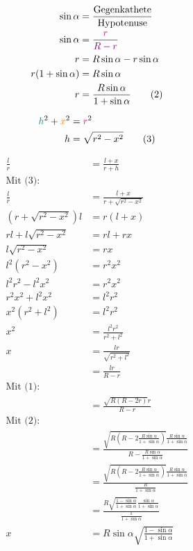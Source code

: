 \documentclass[12pt,a4paper,oneside]{article}
\begin{document}
\begin{align*}
	\sin\alpha &= \frac{\text{Gegenkathete}}{\text{Hypotenuse}} \\
	\sin\alpha &= \frac{ \textcolor{magenta}{r} }{ \textcolor{violet}{R-r} } \\
	r &= R\sin\alpha - r\sin\alpha \\
	r(1+\sin\alpha) &= R\sin\alpha \\
	r &= \frac{R\sin\alpha}{1+\sin\alpha} \tag{2}
\end{align*}

\begin{align*}
	\textcolor{teal}{h}^2 + \textcolor{orange}{x}^2 &= \textcolor{magenta}{r}^2 \\
	h &= \sqrt{r^2-x^2} \tag{3}
\end{align*}

\begin{samepage}
	\begin{align*}
		\frac{l}{r} &= \frac{l+x}{r+h} \\
		\text{Mit (3):} \\
		\frac{l}{r} &= \frac{l+x}{r+\sqrt{r^2-x^2}} \\
		(r+\sqrt{r^2-x^2})l &= r(l+x) \\
		rl + l\sqrt{r^2-x^2} &= rl+rx \\
		l\sqrt{r^2-x^2} &= rx \\
		l^2(r^2-x^2) &= r^2 x^2 \\
		l^2 r^2 - l^2 x^2 &= r^2 x^2 \\
		r^2 x^2 + l^2 x^2 &= l^2 r^2 \\
		x^2 (r^2+l^2) &= l^2 r^2 \\
		x^2 &= \frac{l^2 r^2}{r^2 + l^2} \\
		x &= \frac{lr}{\sqrt{r^2+l^2}} \\
		&= \frac{lr}{R-r} \\
		\text{Mit (1):} \\
		&= \frac{\sqrt{R(R-2r)}r}{R-r} \\
		\text{Mit (2):} \\
		&= \frac{\sqrt{R(R-2\frac{R\sin\alpha}{1+\sin\alpha})}\frac{R\sin\alpha}{1+\sin\alpha}}{R-\frac{R\sin\alpha}{1+\sin\alpha}} \\
		&= \frac{\sqrt{R(R-2\frac{R\sin\alpha}{1+\sin\alpha})}\frac{R\sin\alpha}{1+\sin\alpha}}{\frac{R}{1+\sin\alpha}} \\
		&= \frac{R\sqrt{\frac{1-\sin\alpha}{1+\sin\alpha}}\frac{\sin\alpha}{1+\sin\alpha}}{\frac{1}{1+\sin\alpha}} \\
		x &= R\sin\alpha\sqrt{\frac{1-\sin\alpha}{1+\sin\alpha}} \tag{4}
	\end{align*}
\end{samepage} \goodbreak
\end{document}
